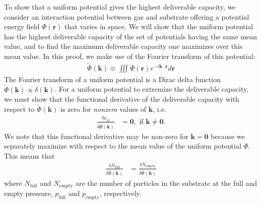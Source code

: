 \documentclass[pre,twocolumn]{revtex4-2}
\newcommand{\rvec}{\mathbf{r}}
\newcommand{\kvec}{\mathbf{k}}
\newcommand\V{\Phi}
\newcommand\Vk{\tilde\Phi(\kvec)}
\newcommand\pfull{\ensuremath{p_{\text{full}}}}
\newcommand\pempty{\ensuremath{p_{\text{empty}}}}
\begin{document}
To show that a uniform potential gives the highest deliverable capacity, we
consider an interaction potential between gas and substrate offering a
potential energy field $\V(\rvec)$ that varies in space. We will show that the
uniform potential has the highest deliverable capacity of the set of potentials
having the same mean value, and to find the maximum deliverable capacity one
maximizes over this mean value. In this proof, we make use of the Fourier
transform of this potential:
\begin{align}
    \Vk \equiv \iiint \V(\rvec) e^{-i\kvec\cdot \rvec} d\rvec
\end{align}
The Fourier transform of a uniform potential is a Dirac delta function
$\tilde{\V}(\kvec)\propto\delta(\kvec)$. For a uniform potential to extremize
the deliverable capacity, we must show that the functional derivative of the
deliverable capacity with respect to $\Vk$ is zero for \emph{nonzero} values of
$\kvec$, i.e.
\begin{align}
    \frac{\delta \rho_D}{\delta \Vk} &= \mathbf{0}, \text{ if } \kvec\ne \mathbf{0}.
\end{align}
We note that this functional derivative may be non-zero for $\kvec=\mathbf{0}$
because we separately maximize with respect to the mean value of the uniform
potential $\V$. This means that
\begin{align}
    \frac{\delta N_\text{full}}{\delta \Vk} &= \frac{\delta N_\text{empty}}{\delta \Vk}
\end{align}
where $N_\text{full}$ and $N_\text{empty}$ are the number of particles in the
substrate at the full and empty pressure, $\pfull$ and $\pempty$, respectively.
\end{document}
